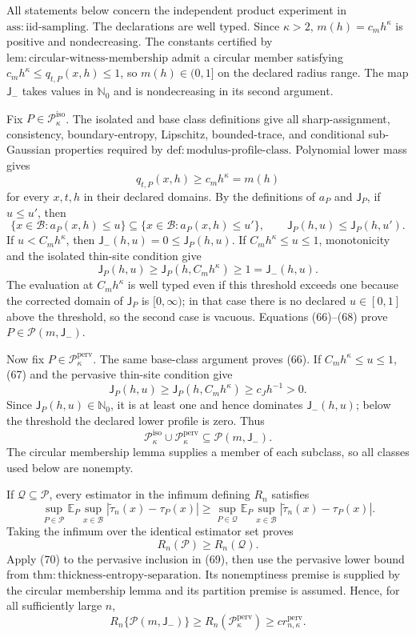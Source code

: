 All statements below concern the independent product experiment in
\(\mathrm{ass:iid\text{-}sampling}\).  The declarations are well typed.
Since \(\kappa>2\), \(m(h)=c_mh^\kappa\) is positive and nondecreasing.
The constants certified by
\(\mathrm{lem:circular\text{-}witness\text{-}membership}\) admit a
circular member satisfying \(c_mh^\kappa\le q_{t,P}(x,h)\le1\), so
\(m(h)\in(0,1]\) on the declared radius range.  The map
\(\mathsf J_{-}\) takes values in \(\mathbb N_0\) and is nondecreasing
in its second argument.

Fix \(P\in\mathcal P_\kappa^{\mathrm{iso}}\).  The isolated and base
class definitions give all sharp-assignment, consistency,
boundary-entropy, Lipschitz, bounded-trace, and conditional sub-Gaussian
properties required by \(\mathrm{def:modulus\text{-}profile\text{-}class}\).
Polynomial lower mass gives
\[
 q_{t,P}(x,h)\ge c_mh^\kappa=m(h)
 \tag{66}
\]
for every \(x,t,h\) in their declared domains.  By the definitions of
\(a_P\) and \(\mathsf J_P\), if \(u\le u'\), then
\[
 \{x\in\mathcal B:a_P(x,h)\le u\}
 \subseteq\{x\in\mathcal B:a_P(x,h)\le u'\},
 \qquad \mathsf J_P(h,u)\le\mathsf J_P(h,u').
 \tag{67}
\]
If \(u<C_mh^\kappa\), then
\(\mathsf J_{-}(h,u)=0\le\mathsf J_P(h,u)\).  If
\(C_mh^\kappa\le u\le1\), monotonicity and the isolated thin-site
condition give
\[
 \mathsf J_P(h,u)\ge\mathsf J_P(h,C_mh^\kappa)
 \ge1=\mathsf J_{-}(h,u).
 \tag{68}
\]
The evaluation at \(C_mh^\kappa\) is well typed even if this threshold
exceeds one because the corrected domain of \(\mathsf J_P\) is
\([0,\infty)\); in that case there is no declared \(u\in[0,1]\) above
the threshold, so the second case is vacuous.  Equations (66)--(68) prove
\(P\in\mathcal P(m,\mathsf J_{-})\).

Now fix \(P\in\mathcal P_\kappa^{\mathrm{perv}}\).  The same base-class
argument proves (66).  If \(C_mh^\kappa\le u\le1\), (67) and the
pervasive thin-site condition give
\[
 \mathsf J_P(h,u)\ge\mathsf J_P(h,C_mh^\kappa)
 \ge c_Jh^{-1}>0.
\]
Since \(\mathsf J_P(h,u)\in\mathbb N_0\), it is at least one and hence
dominates \(\mathsf J_{-}(h,u)\); below the threshold the declared lower
profile is zero.  Thus
\[
 \mathcal P_\kappa^{\mathrm{iso}}\cup
 \mathcal P_\kappa^{\mathrm{perv}}
 \subseteq\mathcal P(m,\mathsf J_{-}).
 \tag{69}
\]
The circular membership lemma supplies a member of each subclass, so all
classes used below are nonempty.

If \(\mathcal Q\subseteq\mathcal P\), every estimator in the infimum
defining \(R_n\) satisfies
\[
 \sup_{P\in\mathcal P}\mathbb E_P\sup_{x\in\mathcal B}
 |\widetilde\tau_n(x)-\tau_P(x)|
 \ge
 \sup_{P\in\mathcal Q}\mathbb E_P\sup_{x\in\mathcal B}
 |\widetilde\tau_n(x)-\tau_P(x)|.
\]
Taking the infimum over the identical estimator set proves
\[
 R_n(\mathcal P)\ge R_n(\mathcal Q).
 \tag{70}
\]
Apply (70) to the pervasive inclusion in (69), then use the pervasive
lower bound from
\(\mathrm{thm:thickness\text{-}entropy\text{-}separation}\).  Its
nonemptiness premise is supplied by the circular membership lemma and
its partition premise is assumed.  Hence, for all sufficiently large
\(n\),
\[
 R_n\{\mathcal P(m,\mathsf J_{-})\}
 \ge R_n(\mathcal P_\kappa^{\mathrm{perv}})
 \ge c r_{n,\kappa}^{\mathrm{perv}}.
 \tag{71}
\]

